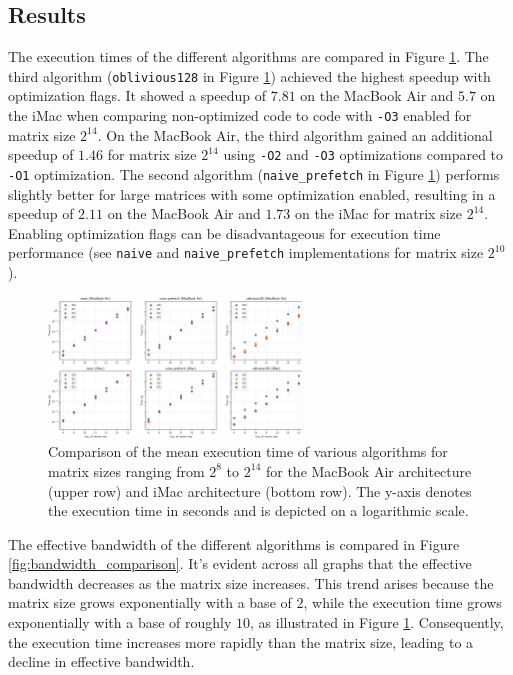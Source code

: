 \documentclass{scrartcl}
\begin{document}
    \subsection{Results}    
    The execution times of the different algorithms are compared in Figure \ref{fig:time_comparison}.
    The third algorithm (\texttt{oblivious128} in Figure \ref{fig:time_comparison}) achieved the highest speedup with optimization flags. It showed a speedup of $7.81$ on the MacBook Air and $5.7$ on the iMac when comparing non-optimized code to code with \texttt{-O3} enabled for matrix size $2^{14}$.
    On the MacBook Air, the third algorithm gained an additional speedup of $1.46$ for matrix size $2^{14}$ using \texttt{-O2} and \texttt{-O3} optimizations compared to \texttt{-O1} optimization.
    The second algorithm (\texttt{naive\_prefetch} in Figure \ref{fig:time_comparison}) performs slightly better for large matrices with some optimization enabled, resulting in a speedup of $2.11$ on the MacBook Air and $1.73$ on the iMac for matrix size $2^{14}$.
    Enabling optimization flags can be disadvantageous for execution time performance (see \texttt{naive} and \texttt{naive\_prefetch} implementations for matrix size $2^{10}$).
    \begin{figure}
        \begin{center}
            \includegraphics[width=0.6\textwidth]{./images/time_comparision.png}
        \end{center}
        \caption{Comparison of the mean execution time of various algorithms for matrix sizes ranging from $2^8$ to $2^{14}$ for the MacBook Air architecture (upper row) and iMac architecture (bottom row). The y-axis denotes the execution time in seconds and is depicted on a logarithmic scale.}
        \label{fig:time_comparison}  
    \end{figure}
    The effective bandwidth of the different algorithms is compared in Figure \ref{fig:bandwidth_comparison}. It's evident across all graphs that the effective bandwidth decreases as the matrix size increases. This trend arises because the matrix size grows exponentially with a base of $2$, while the execution time grows exponentially with a base of roughly $10$, as illustrated in Figure \ref{fig:time_comparison}. Consequently, the execution time increases more rapidly than the matrix size, leading to a decline in effective bandwidth.
\end{document}
